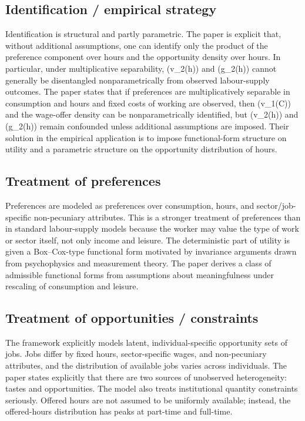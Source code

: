 \documentclass[11pt,a4paper]{article}
\begin{document}
\subsection*{Identification / empirical strategy}
Identification is structural and partly parametric. The paper is explicit that, without additional assumptions, one can identify only the product of the preference component over hours and the opportunity density over hours. In particular, under multiplicative separability, (v\_2(h)) and (g\_2(h)) cannot generally be disentangled nonparametrically from observed labour-supply outcomes. The paper states that if preferences are multiplicatively separable in consumption and hours and fixed costs of working are observed, then (v\_1(C)) and the wage-offer density can be nonparametrically identified, but (v\_2(h)) and (g\_2(h)) remain confounded unless additional assumptions are imposed. Their solution in the empirical application is to impose functional-form structure on utility and a parametric structure on the opportunity distribution of hours.

\subsection*{Treatment of preferences}
Preferences are modeled as preferences over consumption, hours, and sector/job-specific non-pecuniary attributes. This is a stronger treatment of preferences than in standard labour-supply models because the worker may value the type of work or sector itself, not only income and leisure. The deterministic part of utility is given a Box–Cox-type functional form motivated by invariance arguments drawn from psychophysics and measurement theory. The paper derives a class of admissible functional forms from assumptions about meaningfulness under rescaling of consumption and leisure.

\subsection*{Treatment of opportunities / constraints}
The framework explicitly models latent, individual-specific opportunity sets of jobs. Jobs differ by fixed hours, sector-specific wages, and non-pecuniary attributes, and the distribution of available jobs varies across individuals. The paper states explicitly that there are two sources of unobserved heterogeneity: tastes and opportunities. The model also treats institutional quantity constraints seriously. Offered hours are not assumed to be uniformly available; instead, the offered-hours distribution has peaks at part-time and full-time.
\end{document}

